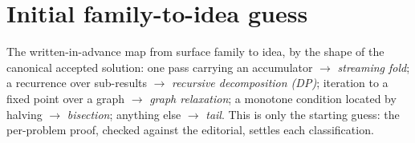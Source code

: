 \documentclass[11pt]{article}
\begin{document}
\appendix
\section{Initial family-to-idea guess}
\label{sec:rule}

The written-in-advance map from surface family to idea, by the shape of the canonical
accepted solution: one pass carrying an accumulator $\to$ \emph{streaming fold}; a recurrence
over sub-results $\to$ \emph{recursive decomposition (DP)}; iteration to a fixed point over a
graph $\to$ \emph{graph relaxation}; a monotone condition located by halving $\to$
\emph{bisection}; anything else $\to$ \emph{tail}. This is only the starting guess: the
per-problem proof, checked against the editorial, settles each classification.
\end{document}
